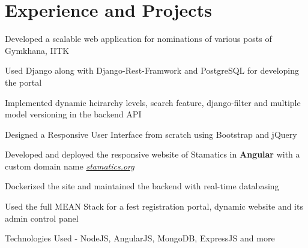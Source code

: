 \documentclass[]{deedy-resume-openfont}
\begin{document}
\hfill
\begin{minipage}[t]{0.69\textwidth} 


\section{Experience and Projects}
\vspace{\topsep} %
\begin{tightemize}
  \item Developed a scalable web application for nominations of various posts of Gymkhana, IITK
  \item Used Django along with Django-Rest-Framwork and PostgreSQL for developing the portal
  \item	Implemented dynamic heirarchy levels, search feature, django-filter and multiple model versioning in the backend API \\
  \item Designed a Responsive User Interface from scratch using Bootstrap and jQuery
\end{tightemize}

\begin{tightemize}
  \item Developed and deployed the responsive website of Stamatics in \textbf{Angular} with a custom domain name \href{http://stamatics.org}{\textit{stamatics.org}}
  \item Dockerized the site and maintained the backend with real-time databasing
\end{tightemize}
\begin{tightemize}
  \item Used the full MEAN Stack for a fest registration portal, dynamic website
    and its admin control panel
  \item Technologies Used - NodeJS, AngularJS, MongoDB, ExpressJS and more
\end{tightemize}


\end{minipage}
\end{document}
